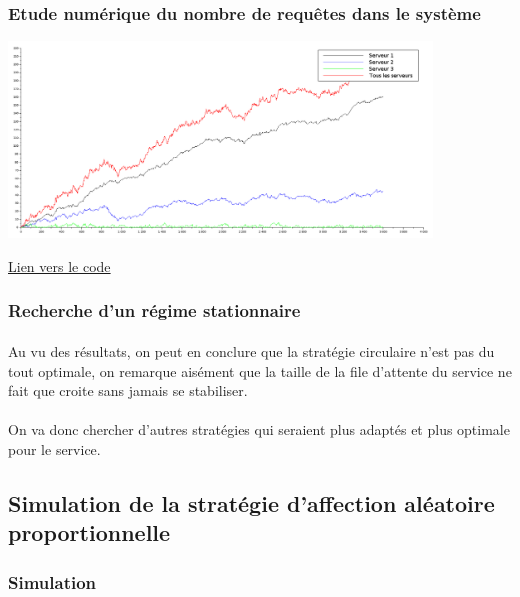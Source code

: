 \documentclass{article}
\begin{document}
\subsubsection{Etude numérique du nombre de requêtes dans le système}

\begin{center}
	\includegraphics[width=425px]{img/tls.png}
\end{center}
\hyperref[tls]{Lien vers le code}

\subsubsection{Recherche d'un régime stationnaire}

\paragraph{}
Au vu des résultats, on peut en conclure que la stratégie circulaire n'est pas du tout optimale, on remarque aisément que la taille de la file d'attente du service ne fait que croite sans jamais se stabiliser.
\paragraph{}
On va donc chercher d'autres stratégies qui seraient plus adaptés et plus optimale pour le service.

\subsection{Simulation de la stratégie d'affection aléatoire proportionnelle}
\subsubsection{Simulation}
\end{document}
